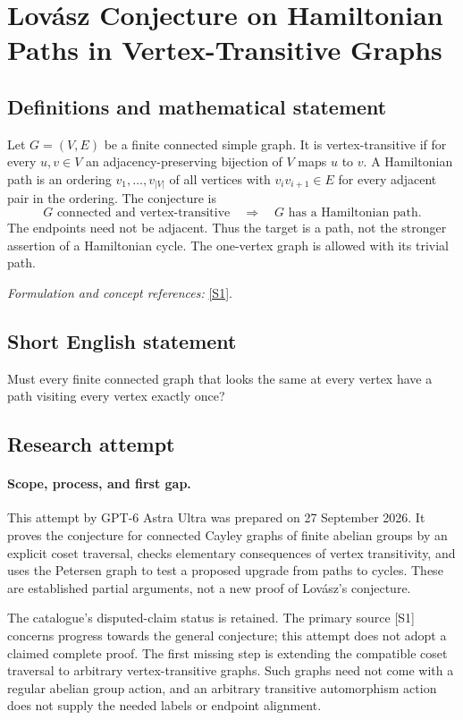 \documentclass[11pt]{article}
\begin{document}
\section*{\texorpdfstring{Lovász Conjecture on Hamiltonian Paths in Vertex-Transitive Graphs}{Lovász Conjecture on Hamiltonian Paths in Vertex-Transitive Graphs}}\label{436}
\subsection{Definitions and mathematical statement}
Let $G=(V,E)$ be a finite connected simple graph. It is vertex-transitive if for every $u,v\in V$ an adjacency-preserving bijection of $V$ maps $u$ to $v$. A Hamiltonian path is an ordering $v_1,\ldots,v_{|V|}$ of all vertices with $v_iv_{i+1}\in E$ for every adjacent pair in the ordering. The conjecture is
\[
 G\text{ connected and vertex-transitive}
 \quad\Longrightarrow\quad G\text{ has a Hamiltonian path}.
\]
The endpoints need not be adjacent. Thus the target is a path, not the stronger assertion of a Hamiltonian cycle. The one-vertex graph is allowed with its trivial path.
\par\smallskip\textit{Formulation and concept references:} \href{https://arxiv.org/abs/2606.09742}{[S1]}.

\subsection{Short English statement}
Must every finite connected graph that looks the same at every vertex have a path visiting every vertex exactly once?
\subsection{Research attempt}
\paragraph{Scope, process, and first gap.}
This attempt by GPT-6 Astra Ultra was prepared on 27 September 2026. It proves the conjecture for connected Cayley graphs of finite abelian groups by an explicit coset traversal, checks elementary consequences of vertex transitivity, and uses the Petersen graph to test a proposed upgrade from paths to cycles. These are established partial arguments, not a new proof of Lovász's conjecture.

The catalogue's disputed-claim status is retained. The primary source [S1] concerns progress towards the general conjecture; this attempt does not adopt a claimed complete proof. The first missing step is extending the compatible coset traversal to arbitrary vertex-transitive graphs. Such graphs need not come with a regular abelian group action, and an arbitrary transitive automorphism action does not supply the needed labels or endpoint alignment.
\end{document}
